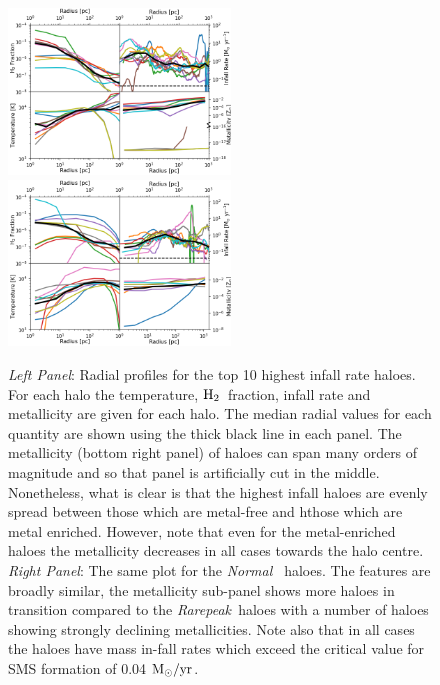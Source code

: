 \documentclass[graphics, twocolumn, usenatbib]{mn2e}
\newcommand{\msolaryrc} {$\rm{M_{\odot}/yr}$}
\newcommand{\molH} {$\rm{H_2}$~}
\newcommand{\rarepeak} {\textit{Rarepeak~}}
\newcommand{\normal} {\textit{Normal~}}
\begin{document}
\begin{figure}
\centering
\begin{minipage}{175mm}      \begin{center} 
\centerline{
\includegraphics[width=0.525\textwidth]{FIGURES/MultiPlot_Rarepeak.png}
\includegraphics[width=0.525\textwidth]{FIGURES/MultiPlot_Normal.png}}
\caption{\textit{Left Panel}: Radial profiles for the top 10 highest infall rate haloes. For
  each halo the temperature, \molH fraction, infall rate and metallicity are given for
  each halo. The median radial values for each quantity are shown using the
  thick black line in each panel. The metallicity (bottom right panel) of haloes can span many
  orders of magnitude and so that panel is artificially cut in the middle. Nonetheless, what is
  clear is that the highest infall haloes are evenly spread between those which are metal-free and hthose which are metal enriched. However, note that even for the metal-enriched haloes the metallicity
  decreases in all cases towards the halo centre. 
  \textit{Right Panel}: The same plot for the \normal
  haloes. The features are broadly similar, the metallicity sub-panel shows more haloes in transition
  compared to the \rarepeak haloes with a number of haloes showing strongly declining metallicities.
  Note also that in all cases the haloes have mass in-fall rates which exceed the critical value
  for SMS formation of 0.04 \msolaryrc.
} \label{Fig:RadialProfiles}
\end{center} \end{minipage}

\end{figure}
\end{document}
